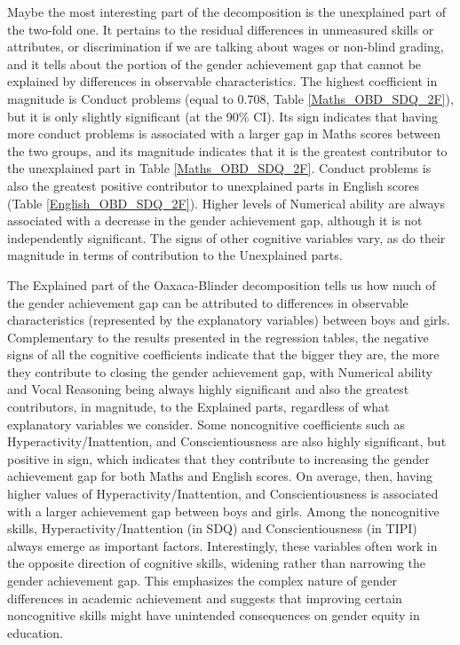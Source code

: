 \documentclass[12pt,a4paper,onecolumn]{article}
\numberwithin{equation}{section}
\begin{document}
Maybe the most interesting part of the decomposition is the unexplained part of the two-fold one. It pertains to the residual differences in unmeasured skills or attributes, or discrimination if we are talking about wages or non-blind grading, and it tells about the portion of the gender achievement gap that cannot be explained by differences in observable characteristics. The highest coefficient in magnitude is Conduct problems (equal to 0.708, Table \ref{Maths_OBD_SDQ_2F}), but it is only slightly significant (at the 90\% CI). Its sign indicates that having more conduct problems is associated with a larger gap in Maths scores between the two groups, and its magnitude indicates that it is the greatest contributor to the unexplained part in Table \ref{Maths_OBD_SDQ_2F}. 
Conduct problems is also the greatest positive contributor to unexplained parts in English scores (Table \ref{English_OBD_SDQ_2F}). Higher levels of Numerical ability are always associated with a decrease in the gender achievement gap, although it is not independently significant. The signs of other cognitive variables vary, as do their magnitude in terms of contribution to the Unexplained parts.

The Explained part of the Oaxaca-Blinder decomposition tells us how much of the gender achievement gap can be attributed to differences in observable characteristics (represented by the explanatory variables) between boys and girls. Complementary to the results presented in the regression tables, the negative signs of all the cognitive coefficients indicate that the bigger they are, the more they contribute to closing the gender achievement gap, with Numerical ability and Vocal Reasoning being always highly significant and also the greatest contributors, in magnitude, to the Explained parts, regardless of what explanatory variables we consider. Some noncognitive coefficients such as Hyperactivity/Inattention, and Conscientiousness are also highly significant, but positive in sign, which indicates that they contribute to increasing the gender achievement gap for both Maths and English scores. On average, then, having higher values of Hyperactivity/Inattention, and Conscientiousness is associated with a larger achievement gap between boys and girls.
Among the noncognitive skills, Hyperactivity/Inattention (in SDQ) and Conscientiousness (in TIPI) always emerge as important factors. Interestingly, these variables often work in the opposite direction of cognitive skills, widening rather than narrowing the gender achievement gap. This emphasizes the complex nature of gender differences in academic achievement and suggests that improving certain noncognitive skills might have unintended consequences on gender equity in education. 
\end{document}
